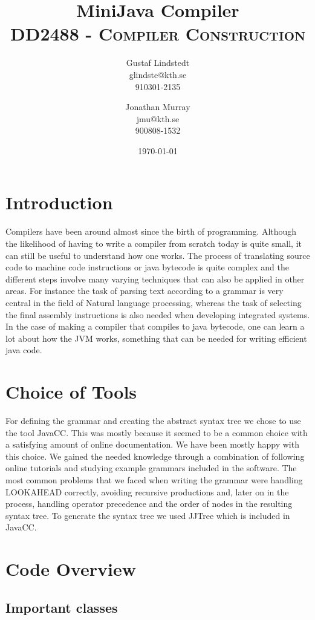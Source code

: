 \documentclass[paper=a4, fontsize=11pt]{scrartcl} %
\title{ 
\huge MiniJava Compiler \\ %
\vspace{10pt}
\normalfont \normalsize 
\textsc{DD2488 - Compiler Construction } \\ [25pt] %
}
\author{Gustaf Lindstedt \\ glindste@kth.se \\ 910301-2135 \and Jonathan Murray \\ jmu@kth.se \\ 900808-1532}
\date{\vspace{8pt}\normalsize\today} %
\numberwithin{equation}{section} %
\numberwithin{figure}{section} %
\numberwithin{table}{section} %
\begin{document}
\maketitle

\section{Introduction}

Compilers have been around almost since the birth of programming.
Although the likelihood of having to write a compiler from scratch today is quite small, it can still be useful to understand how one works.
The process of translating source code to machine code instructions or java bytecode is quite complex and the different steps involve many varying techniques that can also be applied in other areas.
For instance the task of parsing text according to a grammar is very central in the field of Natural language processing, whereas the task of selecting the final assembly instructions is also needed when developing integrated systems.
In the case of making a compiler that compiles to java bytecode, one can learn a lot about how the JVM works, something that can be needed for writing efficient java code.

\section{Choice of Tools}

For defining the grammar and creating the abstract syntax tree we chose to use the tool JavaCC.
This was mostly because it seemed to be a common choice with a satisfying amount of online documentation.
We have been mostly happy with this choice.
We gained the needed knowledge through a combination of following online tutorials and studying example grammars included in the software.
The most common problems that we faced when writing the grammar were handling LOOKAHEAD correctly, avoiding recursive productions and, later on in the process, handling operator precedence and the order of nodes in the resulting syntax tree.
To generate the syntax tree we used JJTree which is included in JavaCC.

\section{Code Overview}

\subsection{Important classes}
\end{document}
